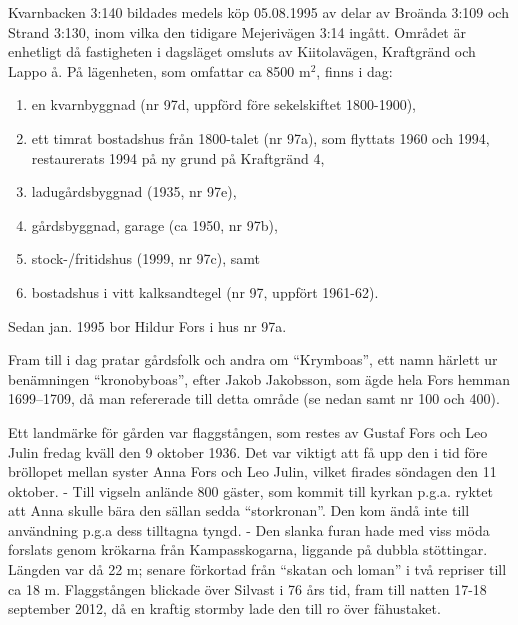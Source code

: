 Kvarnbacken 3:140 bildades medels köp 05.08.1995 av delar av Broända 3:109 och Strand 3:130, inom vilka den tidigare Mejerivägen 3:14 ingått. Området är enhetligt då fastigheten i dagsläget omsluts av Kiitolavägen, Kraftgränd och Lappo å. På lägenheten, som omfattar ca 8500 m$^2$, finns i dag:
\begin{enumerate}
  \item en kvarnbyggnad (nr 97d, uppförd före sekelskiftet 1800-1900),
  \item ett timrat bostadshus från 1800-talet (nr 97a), som flyttats 1960 och 1994, restaurerats 1994 på ny grund på Kraftgränd 4,
  \item ladugårdsbyggnad (1935, nr 97e),
  \item gårdsbyggnad, garage (ca 1950, nr 97b),
  \item stock-/fritidshus (1999, nr 97c), samt
  \item bostadshus i vitt kalksandtegel (nr 97, uppfört 1961-62).
\end{enumerate}
Sedan jan. 1995 bor Hildur Fors i hus nr 97a.


Fram till i dag pratar gårdsfolk och andra om ``Krymboas'', ett namn härlett ur benämningen ``kronobyboas'', efter Jakob Jakobsson, som ägde hela Fors hemman 1699--1709, då man refererade till detta område (se nedan samt nr 100 och 400).

Ett landmärke för gården var flaggstången, som restes av Gustaf	Fors och Leo Julin fredag kväll den 9 oktober 1936. Det var viktigt att få upp den i tid före bröllopet mellan syster Anna Fors och Leo Julin, vilket firades söndagen den 11 oktober. - Till vigseln anlände 800	gäster, som kommit till kyrkan p.g.a. ryktet att Anna skulle bära den sällan sedda ``storkronan''. Den kom ändå inte till användning p.g.a	dess tilltagna tyngd. - Den slanka furan hade med viss möda forslats genom	krökarna från Kampasskogarna, liggande på dubbla stöttingar. Längden var då 22 m; senare förkortad från ``skatan och loman''  i två	repriser till ca 18 m. Flaggstången blickade över Silvast i 76 års tid,	fram till natten 17-18 september 2012, då en kraftig stormby lade den till ro över fähustaket.


